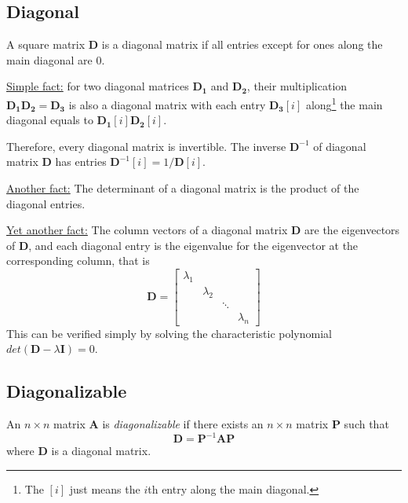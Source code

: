 \subsection{Diagonal}
\begin{definition}
A square matrix $\bm{D}$ is a diagonal matrix if all entries except for ones along the main diagonal are 0.
\end{definition}
\underline{Simple fact:} for two diagonal matrices $\bm{D_1}$ and $\bm{D_2}$, their multiplication $\bm{D_1D_2}=\bm{D_3}$ is also a diagonal matrix with each entry $\bm{D_3}[i]$ along\footnote{The $[i]$ just means the $i$th entry along the main diagonal.} the main diagonal equals to $\bm{D_1}[i]\bm{D_2}[i]$.

Therefore, every diagonal matrix is invertible. The inverse $\bm{D}^{-1}$ of diagonal matrix $\bm{D}$ has entries $\bm{D}^{-1}[i]=1/\bm{D}[i]$.

\underline{Another fact:} The determinant of a diagonal matrix is the product of the diagonal entries.

\underline{Yet another fact:} The column vectors of a diagonal matrix $\bm{D}$ are the eigenvectors of $\bm{D}$, and each diagonal entry is the eigenvalue for the eigenvector at the corresponding column, that is
\begin{equation}
    \bm{D}=\begin{bmatrix}
    \lambda_1 &          \\
              & \lambda_2\\
              &          & \ddots\\
              &          &         & \lambda_n
    \end{bmatrix}
\end{equation}
This can be verified simply by solving the characteristic polynomial $det(\bm{D}-\lambda\bm{I})=0$.


\subsection{Diagonalizable}\label{sec:special:diag}
\begin{definition}
An $n\times n$ matrix $\bm{A}$ is \emph{diagonalizable} if there exists an $n\times n$ matrix $\bm{P}$ such that 
\begin{equation}\label{eq:diag}
    \bm{D}=\bm{P}^{-1}\bm{A}\bm{P}
\end{equation}
where $\bm{D}$ is a diagonal matrix.
\end{definition}

